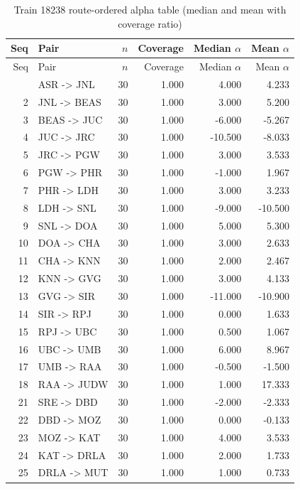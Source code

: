 \small
\setlength{\LTleft}{0pt}
\setlength{\LTright}{0pt}
\begin{longtable}{r p{} r r r r}
\caption{Train 18238 route-ordered alpha table (median and mean with coverage ratio)}\label{tab:app_route_alpha_18238}\\
\toprule
Seq & Pair & $n$ & Coverage & Median $\alpha$ & Mean $\alpha$ \\
\midrule
\endfirsthead
\toprule
Seq & Pair & $n$ & Coverage & Median $\alpha$ & Mean $\alpha$ \\
\midrule
\endhead
\bottomrule
\endfoot
1 & ASR -> JNL & 30 & 1.000 & 4.000 & 4.233 \\
2 & JNL -> BEAS & 30 & 1.000 & 3.000 & 5.200 \\
3 & BEAS -> JUC & 30 & 1.000 & -6.000 & -5.267 \\
4 & JUC -> JRC & 30 & 1.000 & -10.500 & -8.033 \\
5 & JRC -> PGW & 30 & 1.000 & 3.000 & 3.533 \\
6 & PGW -> PHR & 30 & 1.000 & -1.000 & 1.967 \\
7 & PHR -> LDH & 30 & 1.000 & 3.000 & 3.233 \\
8 & LDH -> SNL & 30 & 1.000 & -9.000 & -10.500 \\
9 & SNL -> DOA & 30 & 1.000 & 5.000 & 5.300 \\
10 & DOA -> CHA & 30 & 1.000 & 3.000 & 2.633 \\
11 & CHA -> KNN & 30 & 1.000 & 2.000 & 2.467 \\
12 & KNN -> GVG & 30 & 1.000 & 3.000 & 4.133 \\
13 & GVG -> SIR & 30 & 1.000 & -11.000 & -10.900 \\
14 & SIR -> RPJ & 30 & 1.000 & 0.000 & 1.633 \\
15 & RPJ -> UBC & 30 & 1.000 & 0.500 & 1.067 \\
16 & UBC -> UMB & 30 & 1.000 & 6.000 & 8.967 \\
17 & UMB -> RAA & 30 & 1.000 & -0.500 & -1.500 \\
18 & RAA -> JUDW & 30 & 1.000 & 1.000 & 17.333 \\
21 & SRE -> DBD & 30 & 1.000 & -2.000 & -2.333 \\
22 & DBD -> MOZ & 30 & 1.000 & 0.000 & -0.133 \\
23 & MOZ -> KAT & 30 & 1.000 & 4.000 & 3.533 \\
24 & KAT -> DRLA & 30 & 1.000 & 2.000 & 1.733 \\
25 & DRLA -> MUT & 30 & 1.000 & 1.000 & 0.733 \\

\end{longtable}
